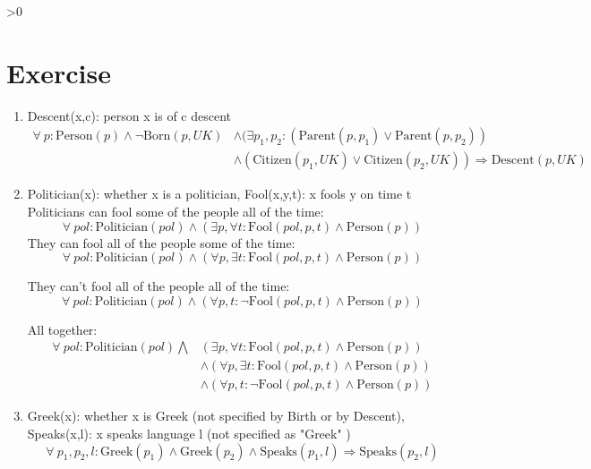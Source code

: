 \documentclass{article}
\newcounter{partCounter}
\newcounter{ExerciseCounter}
\newenvironment{Exercise}[1][-1]{
	\ifnum#1>0
	\setcounter{ExerciseCounter}{#1}
	\fi
	\section{Exercise \arabic{ExerciseCounter}}
	\setcounter{partCounter}{1}
}{
}
\begin{document}
\begin{Exercise}[1]
\begin{enumerate}
    \vspace{15pt}
    
    \item Descent(x,c): person x is of c descent \\
    
    \begin{equation*}
    	\begin{split}
    		\forall ~p: \text{Person}(p) \wedge \neg \text{Born}(p,UK)
    		&\wedge (\exists p_1,p_2 : \left( \text{Parent}(p,p_1) \vee \text{Parent}(p,p_2)\right) \\ &\wedge \left( \text{Citizen}(p_1,UK) \vee \text{Citizen}(p_2,UK) \right) \Rightarrow \text{Descent}(p,UK)
    	\end{split}
    \end{equation*}
    
    \vspace{15pt}
    	
    \item Politician(x): whether x is a politician, Fool(x,y,t): x fools y on time t \\
    
    Politicians can fool some of the people all of the time:    
    $$
    	\forall ~pol : \text{Politician}(pol) \wedge \left(
    	\exists p, \forall t: \text{Fool}(pol,p,t) \wedge \text{Person}(p) \right)
    $$
    They can fool all of the people some of the time:    
    $$
    	\forall ~pol : \text{Politician}(pol) \wedge \left(
    	\forall p, \exists t: \text{Fool}(pol,p,t) \wedge \text{Person}(p) \right)
    $$
    
    They can’t fool all of the people all of the time: 
    $$
    	\forall ~pol : \text{Politician}(pol) \wedge \left(
    	\forall p,t: \neg \text{Fool}(pol,p,t) \wedge \text{Person}(p) \right)
    $$

    All together:
    \begin{equation*}
    		\begin{split}
    			\forall ~pol : \text{Politician}(pol) \bigwedge &
    			 (\exists p, \forall t: \text{Fool}(pol,p,t) \wedge \text{Person}(p) ) \\
    			& \wedge \left( \forall p, \exists t: \text{Fool}(pol,p,t) \wedge \text{Person}(p) \right) \\
    			& \wedge \left( \forall p,t: \neg \text{Fool}(pol,p,t) \wedge \text{Person}(p) \right)
    		\end{split}
    	\end{equation*}
    
   	\vspace{15pt}
   	
    \item Greek(x): whether x is Greek (not specified by Birth or by Descent), Speaks(x,l): x speaks language l (not specified as "Greek" )\\
    
    $$ \forall ~p_1,p_2,l: \text{Greek}(p_1) \wedge \text{Greek}(p_2) \wedge \text{Speaks}(p_1,l) \Rightarrow \text{Speaks}(p_2,l)$$
    
\end{enumerate}
		
\end{Exercise}
\end{document}
